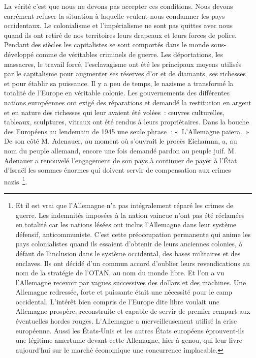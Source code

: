 \documentclass[french,twoside]{book} %
\begin{document}
\noindent La vérité c’est que nous ne devons pas accepter ces conditions. Nous devons carrément refuser la situation à laquelle veulent nous condamner les pays occidentaux. Le colonialisme et l’impérialisme ne sont pas quittes avec nous quand ils ont retiré de nos territoires leurs drapeaux et leurs forces de police. Pendant des siècles les capitalistes se sont comportés dans le monde sous-développé comme de véritables criminels de guerre. Les déportations, les massacres, le travail forcé, l’esclavagisme ont été les principaux moyens utilisés par le capitalisme pour augmenter ses réserves d’or et de diamants, ses richesses et pour établir sa puissance. Il y a peu de temps, le nazisme a transformé la totalité de l’Europe en véritable colonie. Les gouvernements des différentes nations européennes ont exigé des réparations et demandé la restitution en argent et en nature des richesses qui leur avaient été volées : œuvres culturelles, tableaux, sculptures, vitraux ont été rendus à leurs propriétaires. Dans la bouche des Européens au lendemain de 1945 une seule phrase : « L’Allemagne paiera. » De son côté M. Adenauer, au moment où s’ouvrait le procès Eichamnn, a, au nom du peuple allemand, encore une fois demandé pardon au peuple juif. M. Adenauer a renouvelé l’engagement de son pays à continuer de payer à l’État d’Israël les   sommes énormes qui doivent servir de compensation aux crimes nazis \footnote{Et il est vrai que l’Allemagne n’a pas intégralement réparé les crimes de guerre. Les indemnités imposées à la nation vaincue n’ont pas été réclamées en totalité car les nations lésées ont inclus l’Allemagne dans leur système défensif, anticommuniste. C’est cette préoccupation permanente qui anime les pays colonialistes quand ils essaient d’obtenir de leurs anciennes colonies, à défaut de l’inclusion dans le système occidental, des bases militaires et des enclaves. Ils ont décidé d’un commun accord d’oublier leurs revendications au nom de la stratégie de l’OTAN, au nom du monde libre. Et l’on a vu l’Allemagne recevoir par vagues successives des dollars et des machines. Une Allemagne redressée, forte et puissante était une nécessité pour le camp occidental. L’intérêt bien compris de l’Europe dite libre voulait une Allemagne prospère, reconstruite et capable de servir de premier rempart aux éventuelles hordes rouges. L’Allemagne a merveilleusement utilisé la crise européenne. Aussi les États-Unis et les autres États européens éprouvent-ils une légitime amertume devant cette Allemagne, hier à genou, qui leur livre aujourd’hui sur le marché économique une concurrence implacable.}.\par
\end{document}
